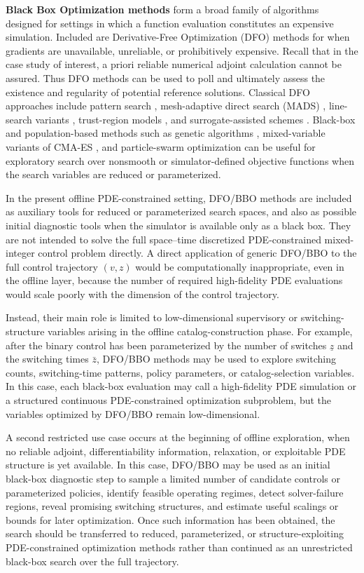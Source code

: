 \documentclass{article}
\newcommand{\1}{\mathds{1}}          %
\theoremstyle{definition}
\begin{document}
\begin{sloppypar}
{\bf Black Box Optimization methods} form a broad family of algorithms designed for settings in which a function evaluation constitutes an expensive simulation. Included are Derivative-Free Optimization (DFO) methods for when
gradients are unavailable, unreliable, or prohibitively expensive. Recall that in the case study of interest, a priori reliable numerical adjoint calculation cannot be assured. Thus DFO methods can be used to poll and ultimately assess the existence and regularity of potential reference solutions. Classical DFO
approaches include pattern search \cite{Torczon1997}, mesh-adaptive direct search (MADS)
\cite{AudetDennis2006}, line-search variants \cite{SDBOX,VRBBO}, trust-region models
\cite{Conn2009,MATRS}, and surrogate-assisted schemes \cite{Regis2007}. Black-box and population-based methods such as genetic algorithms \cite{Holland1992},
mixed-variable variants of CMA-ES \cite{Hansen,MADFO}, and particle-swarm optimization
\cite{Kennedy2011} can be useful for exploratory search over nonsmooth or simulator-defined
objective functions when the search variables are reduced or parameterized.



In the present offline PDE-constrained setting, DFO/BBO methods are included as
auxiliary tools for reduced or parameterized search spaces, and also as possible initial
diagnostic tools when the simulator is available only as a black box. They are not intended
to solve the full space--time discretized PDE-constrained mixed-integer control problem
directly. A direct application of generic DFO/BBO to the full control trajectory $(v,z)$
would be computationally inappropriate, even in the offline layer, because the number of
required high-fidelity PDE evaluations would scale poorly with the dimension of the control
trajectory.

Instead, their main role is limited to low-dimensional supervisory or switching-structure
variables arising in the offline catalog-construction phase. For example, after the binary
control has been parameterized by the number of switches $\underline z$ and the switching
times $\bar z$, DFO/BBO methods may be used to explore switching counts, switching-time
patterns, policy parameters, or catalog-selection variables. In this case, each black-box
evaluation may call a high-fidelity PDE simulation or a structured continuous PDE-constrained
optimization subproblem, but the variables optimized by DFO/BBO remain low-dimensional.

A second restricted use case occurs at the beginning of offline exploration, when no
reliable adjoint, differentiability information, relaxation, or exploitable PDE structure is
yet available. In this case, DFO/BBO may be used as an initial black-box diagnostic step to
sample a limited number of candidate controls or parameterized policies, identify feasible
operating regimes, detect solver-failure regions, reveal promising switching structures, and
estimate useful scalings or bounds for later optimization. Once such information has been
obtained, the search should be transferred to reduced, parameterized, or structure-exploiting
PDE-constrained optimization methods rather than continued as an unrestricted black-box
search over the full trajectory.


\end{sloppypar}
\end{document}
